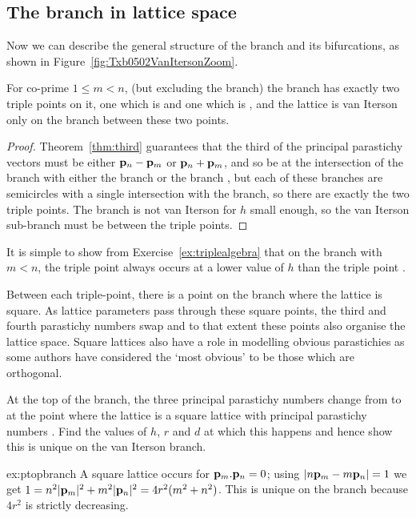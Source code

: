 \subsection{The  branch in lattice space}
Now we can describe the general structure of the  branch and its bifurcations, as shown in Figure~\ref{fig:Txb0502VanItersonZoom}.
\begin{theorem}
	For co-prime $1\leq m<n$,  (but excluding the  branch) the  branch has exactly two triple points on it, one which is  and one which is ,  and the lattice is van Iterson only on the branch between these two points.
\end{theorem}
\begin{proof}
	Theorem~\ref{thm:third} guarantees that the third of the principal parastichy vectors must be either ${\mathbf p}_{n}-{\mathbf p}_{m}$  or  ${\mathbf p}_{n}+{\mathbf p}_{m}$, 
	and so be at the intersection of the branch with either the branch   or the branch  , but each of these branches are semicircles with a single intersection with the  branch, so there are exactly the two triple points.  The  branch is not van Iterson for $h$ small enough, so the van Iterson sub-branch must be between the triple points. 
\end{proof}
It is simple to show from Exercise~\ref{ex:triplealgebra} that on the   branch with $m<n$, the triple point  always occurs at a lower value of $h$ than the triple point . 


Between each triple-point, there is a point on the branch where the lattice is square. 
As lattice parameters pass through these square points, the third and fourth parastichy numbers swap and to that extent these points also organise the lattice space. 
Square lattices also have a role in modelling obvious parastichies as some authors have considered the `most obvious' to be those which are orthogonal. 
\begin{jExercise}\label{ex:ptopbranch}
	At the top of the  branch, the three principal parastichy numbers change from  to  at the point where the lattice is a square lattice with principal parastichy numbers . Find the values of $h$, $r$ and $d$ at which this happens and hence show this is unique on the van Iterson branch.
\end{jExercise}
\begin{jAnswer}{ex:ptopbranch}{
	A square lattice occurs for ${\mathbf p}_{m}.{\mathbf p}_{n}=0$; using $|n{\mathbf p}_{m}-m{\mathbf p}_{n}|=1$ we get
	$1=n^2|{\mathbf p}_{m}|^2+m^2|{\mathbf p}_{n}|^2= 4 r^2 ( m^2+n^2)$. This is unique on the branch because  $4r^2$ is strictly decreasing.
}\end{jAnswer}


